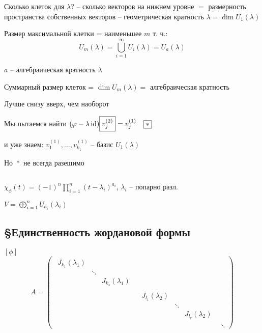     \pagebreak
    \begin{remark}
        $ $
        \par Сколько клеток для $\lambda$? -- сколько векторов на нижнем уровне $=$ размерность пространства 
        собственных векторов -- геометрическая кратность $\lambda = \dim U_1(\lambda)$
        \par Размер максимальной клетки = наименьшее $m$ т. ч.:
        \[
            U_m(\lambda) = \bigcup_{i=1}^\infty U_i(\lambda) = U_a(\lambda)    
        \]
        \par \quad $a$ -- алгебраическая кратность $\lambda$
        \par Суммарный размер клеток = $\dim U_m(\lambda) = $ алгебраическая кратность
    \end{remark}

    \begin{remark}
        Лучше снизу вверх, чем наоборот
        \par \quad Мы пытаемся найти $(\varphi - \lambda \operatorname{id}) \boxed{v_j^{(2)}} = v_j^{(1)} \quad \boxed{*}$
        \par \quad и уже знаем: $v_1^{(1)}, \dots , v_{k_1}^{(1)}$ -- базис $U_1(\lambda)$
        \par \quad Но $\boxed{*}$ не всегда разешимо
    \end{remark}

    \begin{theorem}
        $ $
        \par $\chi_\phi(t) = (-1)^n \prod_{i=1}^n (t - \lambda_i)^{a_i}$, $\lambda_i$ -- попарно разл.
        \par $V = \bigoplus_{i=1}^n U_{a_i}(\lambda_i)$ 
    \end{theorem}

    \subsection*{\S Единственность жордановой формы}

    \par $[\phi]$
    \[
        A = \begin{pmatrix}
            \boxed{
            \begin{matrix}
                J_{k_1}(\lambda_1) & & \\
                & \ddots & \\
                & & J_{k_s}(\lambda_1)
            \end{matrix}} & & \\
            & \boxed{
                \begin{matrix}
                    J_{l_1}(\lambda_2) & & \\
                    & \ddots & \\
                    & & J_{l_r}(\lambda_2)
                \end{matrix}} & \\
            & & \ddots
        \end{pmatrix}    
    \]

